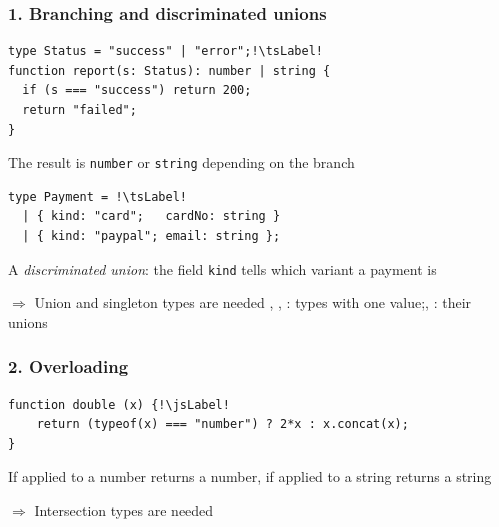 \newcommand{\tsLabel}{\hfill\textcolor{gray}{\sffamily{\scriptsize T}{\tiny YPE}{\scriptsize S}{\tiny CRIPT}}}%
\newcommand{\jsLabel}{\hfill\textcolor{gray}{\sffamily{\scriptsize J}{\tiny AVA}{\scriptsize S}{\tiny CRIPT}}}%
\begin{frame}[fragile]\transdissolve
\frametitle{1. Branching and discriminated unions}\vspace{-4mm}
\begin{verbatim}
type Status = "success" | "error";!\tsLabel!
function report(s: Status): number | string {
  if (s === "success") return 200;
  return "failed";
}
\end{verbatim}
{\small\color{gray}The result is \texttt{number} or \texttt{string} depending on the branch\par}
\pause
\vspace{-2mm}
\begin{verbatim}
type Payment = !\tsLabel!
  | { kind: "card";   cardNo: string }
  | { kind: "paypal"; email: string };
\end{verbatim}
\vspace{-1mm}%
{\small\color{gray}A \emph{discriminated union}: the field \texttt{kind} tells which variant a payment is\par}
\pause
\begin{exampleblock}{$\Rightarrow$ Union and singleton types are needed}
, , : types with one value;\quad {}, : their unions
\end{exampleblock}
\end{frame}



\begin{frame}[fragile]\transdissolve
\frametitle{2. Overloading}

\begin{verbatim}
function double (x) {!\jsLabel!
    return (typeof(x) === "number") ? 2*x : x.concat(x);
}
\end{verbatim}
If applied to a number returns a number, if applied to a string returns a string
\pause
\begin{exampleblock}{$\Rightarrow$ Intersection types are needed}
\end{exampleblock}
\end{frame}




